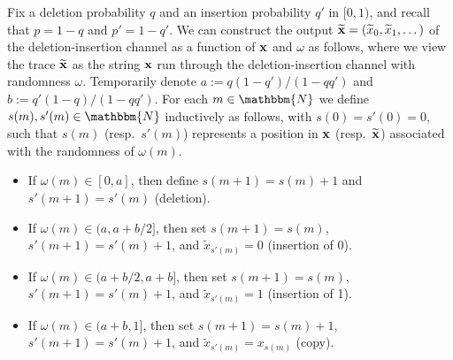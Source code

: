 \documentclass[final,12pt]{colt2018} %
\newcommand{\N}{\mathbbm{N}}
\newcommand{\1}{\mathbf{1}}
\newcommand{\wt}{\widetilde}
\def\xt{{\wt {\bf x}}}
\def\x{{\bf x}}
\begin{document}
Fix a deletion probability $q$ and an insertion probability $q'$ in $[0,1)$,
and recall that $p=1-q$ and $p'=1-q'$. We can construct the output $\xt=(\wt x_0,\wt x_1,\dots)$ of the deletion-insertion channel as a function of $\x$ and $\omega$ as follows, where we view the trace $\xt$ as the string $\x$ run through the deletion-insertion channel with randomness $\omega$.
Temporarily denote $a := q(1-q')/(1-qq')$ and $b := q'(1-q)/(1-qq')$.
For each $m \in \N$ we define $s(m) , s'(m) \in \N$
inductively as follows, with $s(0) = s'(0) = 0$, such that $s(m)$ (resp.\ $s'(m)$) represents a position in $\x$ (resp.\ $\xt$) associated with the randomness of $\omega(m)$.
%
\begin{itemize}
	\item If $\omega(m) \in[0,a]$, then define $s(m+1)=s(m)+1$ and
	$s'(m+1)=s'(m)$ (deletion).
	\item If $\omega(m)\in(a,a+b/2]$, then set $s(m+1)=s(m)$, $s'(m+1)=s'(m)+1$,
	and $\wt x_{s'(m)}=0$ (insertion of 0).
	\item If $\omega(m)\in(a+b/2,a+b]$, then set $s(m+1)=s(m)$, $s'(m+1)=s'(m)+1$,
	and $\wt x_{s'(m)}=1$ (insertion of 1).
	\item If $\omega(m)\in(a+b,1]$, then set $s(m+1)=s(m)+1$, $s'(m+1)=s'(m)+1$,
	and $\wt x_{s'(m)}=x_{s(m)}$ (copy).
\end{itemize}
\end{document}
